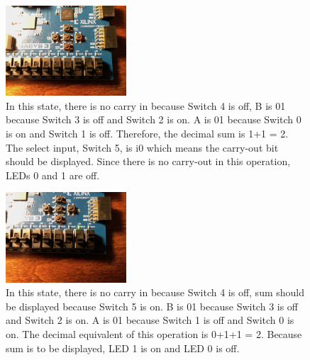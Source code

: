 \documentclass[11pt]{article}
\begin{document}
\begin{figure}[H]
\begin{center}
	\includegraphics[width=0.4\textwidth]{./report-images/Part2/IMG_0469.jpg}
	\caption{\label{fig:BitMuxOnePlusOneCarry}In this state, there is no carry in because Switch 4 is off, B is 01 because Switch 3 is off and Switch 2 is on. A is 01 because Switch 0 is on and Switch 1 is off. Therefore, the decimal sum is 1+1 = 2. The select input, Switch 5, is i0 which means the carry-out bit should be displayed. Since there is no carry-out in this operation, LEDs 0 and 1 are off.}
\end{center}
\end{figure}

\begin{figure}[H]
\begin{center}
	\includegraphics[width=0.4\textwidth]{./report-images/Part2/IMG_0470.jpg}
	\caption{\label{fig:BitMuxOnePlusOneSum}In this state, there is no carry in because Switch 4 is off, sum should be displayed because Switch 5 is on. B is 01 because Switch 3 is off and Switch 2 is on. A is 01 because Switch 1 is off and Switch 0 is on. The decimal equivalent of this operation is 0+1+1 = 2. Because sum is to be displayed, LED 1 is on and LED 0 is off.}
\end{center}
\end{figure}
\end{document}

